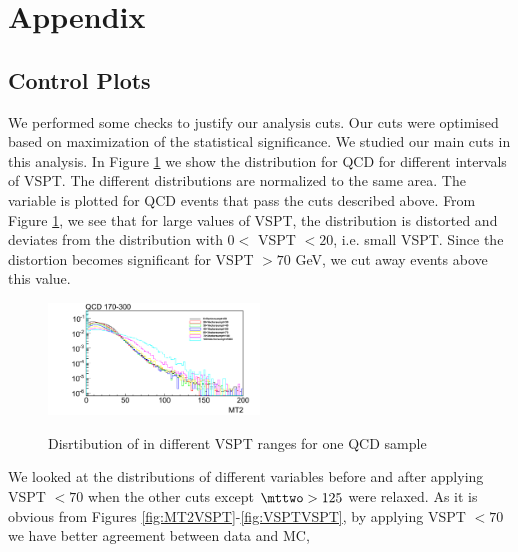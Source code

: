 \newpage
\section{Appendix}
\usepackage{float}
\subsection{Control Plots}
\label{sect:Appendix}
We performed some checks to justify our analysis cuts. Our cuts were optimised based on maximization of the statistical significance. We studied our main cuts in this analysis.
In Figure \ref{fig:MT2diffVSPT} we show the \mttwo distribution for QCD for different intervals of VSPT. The different distributions 
are normalized to the same area. The variable is plotted for QCD events that
pass the cuts described above. From Figure \ref{fig:MT2diffVSPT}, we see that for
large values of VSPT, the \mttwo distribution is distorted and deviates from the distribution with
$0 <$ VSPT $<20$, i.e. small VSPT. Since the distortion becomes significant for VSPT $> 70$ GeV, we
cut away events above this value. 
\begin{figure}[!Hhtb]
\begin{center}
\includegraphics[angle=00,width=0.5\textwidth]{figs/MT2-diffVSPT-QCD170-300.png}\\
\end{center}
\caption{Disrtibution of \mttwo in different VSPT ranges for one QCD sample}
\label{fig:MT2diffVSPT}
\end{figure}
  
We looked at the distributions of different variables before and after applying VSPT $<70$ when the other cuts 
except $\mttwo > 125 $ were relaxed. As it is obvious from Figures \ref{fig:MT2VSPT}-\ref{fig:VSPTVSPT}, by applying VSPT $<70$ we have better agreement 
between data and MC,

